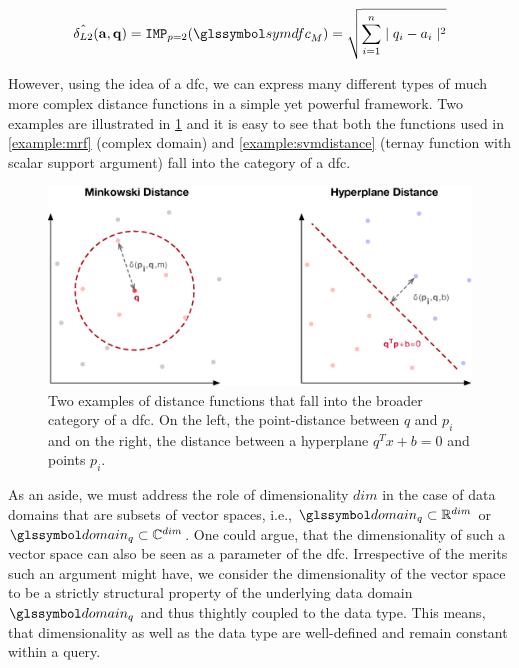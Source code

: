 \begin{equation}
    \hat{\delta_{L2}}(\mathbf{a},\mathbf{q}) = \texttt{IMP}_{p=2}(\symdfc_M) = \sqrt{\sum_{i=1}^{n} \mid q_i - a_i \mid^2}
\end{equation}

However, using the idea of a \acrshort{dfc}, we can express many different types of much more complex distance functions in a simple yet powerful framework. Two examples are illustrated in \cref{figure:distance_computation} and it is easy to see that both the functions used in \cref{example:mrf} (complex domain) and \cref{example:svmdistance} (ternay function with scalar support argument) fall into the category of a \acrshort{dfc}.

\begin{figure}[bt]
    \centering
    \includegraphics[width=\textwidth]{figures/distance_computations.eps}
    \caption{Two examples of distance functions that fall into the broader category of a \acrshort{dfc}. On the left, the point-distance between $q$ and $p_i$ and on the right, the distance between a hyperplane $q^Tx+b = 0$ and points $p_i$.}
    \label{figure:distance_computation}
\end{figure}

As an aside, we must address the role of dimensionality $dim$ in the case of data domains that are subsets of vector spaces, i.e.,  $\domain_q \subset \mathbb{R}^{dim}$ or $\domain_q \subset \mathbb{C}^{dim}$. One could argue, that the dimensionality of such a vector space can also be seen as a parameter of the \acrshort{dfc}. Irrespective of the merits such an argument might have, we consider the dimensionality of the vector space to be a strictly structural property of the underlying data domain $\domain_q$ and thus thightly coupled to the data type. This means, that dimensionality as well as the data type are well-defined and remain constant within a query.

